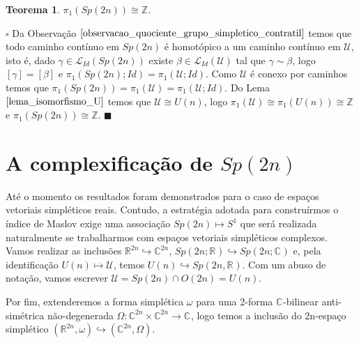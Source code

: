 \documentclass[12pt]{book}
\newtheorem{teorema}{Teorema}[section]
\newenvironment{prova}[1]{$\square$ #1}{\hfill$\blacksquare$}
\newcommand{\caminhospontobasegeral}[2]{\mathcal{L}_{#1}(#2)}
\newcommand{\circulo}{S^{1}}
\newcommand{\classe}[1]{[#1]}
\newcommand{\complexo}[1]{\mathbb{C}^{#1}}
\newcommand{\grupofundamental}[1]{\pi_{1}(#1)}
\newcommand{\grupofundamentalpontobase}[2]{\pi_{1}(#1; #2)}
\newcommand{\gruposimpletico}[1]{Sp(#1)}
\newcommand{\gruposimpleticocomplexo}[1]{Sp(#1; \complexo{})}
\newcommand{\gruposimpleticoreal}[1]{Sp(#1;\reta)}
\newcommand{\inteiros}{\mathbb{Z}}
\newcommand{\matrizortogonal}[1]{O(#1)}
\newcommand{\matrizSimpleticaOrtogonal}{\mathcal{U}}
\newcommand{\matrizunitaria}[1]{U(#1)}
\newcommand{\real}[1]{\mathbb{R}^{#1}}
\newcommand{\reta}{\real{}}
\begin{document}
	\begin{teorema}
		$\grupofundamental{\gruposimpletico{2n}} \cong \inteiros$.
	\end{teorema}
	\begin{prova}
		Da Observação $\ref{observacao_quociente_grupo_simpletico_contratil}$ temos que todo caminho contínuo em $\gruposimpletico{2n}$ é homotópico a um caminho contínuo em $\matrizSimpleticaOrtogonal$, isto é, dado $\gamma \in \caminhospontobasegeral{Id }{\gruposimpletico{2n}}$ existe $\beta \in \caminhospontobasegeral{Id}{\matrizSimpleticaOrtogonal}$ tal que $\gamma \sim \beta$, logo $\classe{\gamma} = \classe{\beta}$ e 
		$\grupofundamentalpontobase{\gruposimpletico{2n}}{Id} = \grupofundamentalpontobase{\matrizSimpleticaOrtogonal}{Id}$. Como $\matrizSimpleticaOrtogonal$ é conexo por caminhos temos que $\grupofundamental{\gruposimpletico{2n}} =\grupofundamental{\matrizSimpleticaOrtogonal}= \grupofundamentalpontobase{\matrizSimpleticaOrtogonal}{Id}$. Do Lema $\ref{lema_isomorfismo_U}$ temos que $\matrizSimpleticaOrtogonal\cong \matrizunitaria{n}$, logo $\grupofundamental{\matrizSimpleticaOrtogonal} \cong \grupofundamental{\matrizunitaria{n}} \cong \inteiros$ e $\grupofundamental{\gruposimpletico{2n}} \cong \inteiros$.
	\end{prova}
	
	\section{A complexificação de $\gruposimpletico{2n}$}\label{capitulo_complexificacao_grupo_simpetico}
	
		Até o momento os resultados foram demonstrados para o caso de espaços vetoriais simpléticos reais. Contudo, a estratégia adotada para construírmos o índice de Maslov exige uma associação $\gruposimpletico{2n}\mapsto \circulo$ que será realizada naturalmente se trabalharmos com espaços vetoriais simpléticos complexos. Vamos realizar as inclusões $\real{2n} \hookrightarrow \complexo{2n}$, $\gruposimpleticoreal{2n} \hookrightarrow \gruposimpleticocomplexo{2n}$ e, pela identificação $\matrizunitaria{n} \mapsto \matrizSimpleticaOrtogonal$, temos $\matrizunitaria{n} \hookrightarrow \gruposimpletico{2n, \reta}$. Com um abuso de notação, vamos escrever $\matrizSimpleticaOrtogonal = \gruposimpletico{2n} \cap \matrizortogonal{2n }= \matrizunitaria{n}$. 
		
		Por fim, extenderemos a forma simplética $\omega$ para uma 2-forma $\complexo{}$-bilinear anti-simétrica não-degenerada $\Omega:\complexo{2n}\times \complexo{2n} \to \complexo{}$, logo temos a inclusão do 2n-espaço simplético $(\real{2n}, \omega) \hookrightarrow (\complexo{2n}, \Omega)$.
		
\end{document}
